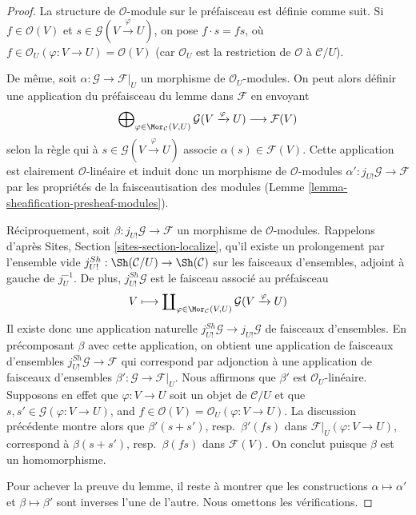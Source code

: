 \begin{proof}
La structure de $\mathcal{O}$-module sur le préfaisceau est définie
comme suit. Si $f \in \mathcal{O}(V)$ et
$s \in \mathcal{G}(V \xrightarrow{\varphi} U)$, on pose
$f \cdot s = fs$, où
$f \in \mathcal{O}_U(\varphi : V \to U) = \mathcal{O}(V)$
(car $\mathcal{O}_U$ est la restriction de $\mathcal{O}$ à
$\mathcal{C}/U$).

\medskip\noindent
De même, soit $\alpha : \mathcal{G} \to \mathcal{F}|_U$ un
morphisme de $\mathcal{O}_U$-modules. On peut alors définir une
application du préfaisceau du lemme dans $\mathcal{F}$ en envoyant
$$
\bigoplus\nolimits_{\varphi \in \Mor_\mathcal{C}(V, U)}
\mathcal{G}(V \xrightarrow{\varphi} U)
\longrightarrow
\mathcal{F}(V)
$$
selon la règle qui à $s \in \mathcal{G}(V \xrightarrow{\varphi} U)$
associe $\alpha(s) \in \mathcal{F}(V)$. Cette application est clairement
$\mathcal{O}$-linéaire et induit donc un morphisme de
$\mathcal{O}$-modules $\alpha' : j_{U!}\mathcal{G} \to \mathcal{F}$
par les propriétés de la faisceautisation des modules
(Lemme \ref{lemma-sheafification-presheaf-modules}).

\medskip\noindent
Réciproquement, soit $\beta : j_{U!}\mathcal{G} \to \mathcal{F}$
un morphisme de $\mathcal{O}$-modules.
Rappelons d'après Sites, Section \ref{sites-section-localize},
qu'il existe un prolongement par l'ensemble vide
$j^{Sh}_{U!} : \Sh(\mathcal{C}/U) \to \Sh(\mathcal{C})$
sur les faisceaux d'ensembles, adjoint à gauche de $j_U^{-1}$.
De plus, $j^{Sh}_{U!}\mathcal{G}$ est le faisceau associé au préfaisceau
$$
V
\longmapsto
\coprod\nolimits_{\varphi \in \Mor_\mathcal{C}(V, U)}
\mathcal{G}(V \xrightarrow{\varphi} U)
$$
Il existe donc une application naturelle
$j^{Sh}_{U!}\mathcal{G} \to j_{U!}\mathcal{G}$ de faisceaux d'ensembles.
En précomposant $\beta$ avec cette application, on obtient une
application de faisceaux d'ensembles
$j^{Sh}_{U!}\mathcal{G} \to \mathcal{F}$ qui correspond par adjonction
à une application de faisceaux d'ensembles
$\beta' : \mathcal{G} \to \mathcal{F}|_U$.
Nous affirmons que $\beta'$ est $\mathcal{O}_U$-linéaire. Supposons en effet
que $\varphi : V \to U$ soit un objet de $\mathcal{C}/U$ et que
$s, s' \in \mathcal{G}(\varphi : V \to U)$, and
$f \in \mathcal{O}(V) = \mathcal{O}_U(\varphi : V \to U)$.
La discussion précédente montre alors que
$\beta'(s + s')$, resp.\ $\beta'(fs)$ dans
$\mathcal{F}|_U(\varphi : V \to U)$, correspond à
$\beta(s + s')$, resp.\ $\beta(fs)$ dans
$\mathcal{F}(V)$. On conclut puisque $\beta$ est un homomorphisme.

\medskip\noindent
Pour achever la preuve du lemme, il reste à montrer que les constructions
$\alpha \mapsto \alpha'$ et $\beta \mapsto \beta'$ sont inverses l'une de
l'autre. Nous omettons les vérifications.
\end{proof}

